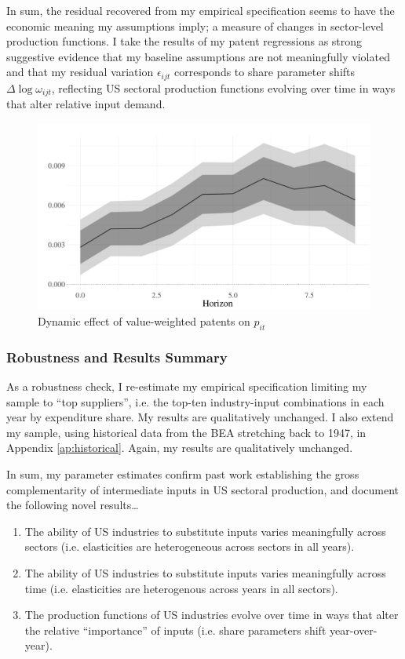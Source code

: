 \documentclass[11pt]{article}
\begin{document}
In sum, the residual recovered from my empirical specification seems to have the economic meaning my assumptions imply; a measure of changes in sector-level production functions. I take the results of my patent regressions as strong suggestive evidence that my baseline assumptions are not meaningfully violated and that my residual variation $\epsilon_{ijt}$ corresponds to share parameter shifts $\Delta \log \omega_{ijt}$, reflecting US sectoral production functions evolving over time in ways that alter relative input demand.

\begin{figure}[!h]
\centering 
\includegraphics[width=.75\textwidth]{../figures/local_projections/patents_citations_resid.pdf}
\caption[Dynamic effect of value-weighted patents on $p_{it}$]{Dynamic effect of value-weighted patents on $p_{it}$ \footnotemark}
\label{fig:patents_citations_resid}
\end{figure}

\subsubsection*{Robustness and Results Summary}

As a robustness check, I re-estimate my empirical specification limiting my sample to ``top suppliers'', i.e. the top-ten industry-input combinations in each year by expenditure share. My results are qualitatively unchanged. I also extend my sample, using historical data from the BEA stretching back to 1947, in Appendix \ref{ap:historical}. Again, my results are qualitatively unchanged. 

In sum, my parameter estimates confirm past work establishing the gross complementarity of intermediate inputs in US sectoral production, and document the following novel results\dots
\begin{enumerate}
    \item The ability of US industries to substitute inputs varies meaningfully across sectors (i.e. elasticities are heterogeneous across sectors in all years).
    \item The ability of US industries to substitute inputs varies meaningfully across time (i.e. elasticities are heterogenous across years in all sectors).
    \item The production functions of US industries evolve over time in ways that alter the relative ``importance'' of inputs (i.e. share parameters shift year-over-year).
\end{enumerate}
\end{document}

